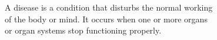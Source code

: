 \documentclass[preview]{standalone}
\begin{document}
\begin{flushleft}
A disease is a condition that disturbs the normal working\\of the body or mind. It occurs when one or more organs\\or organ systems stop functioning properly.
\end{flushleft}
\end{document}
